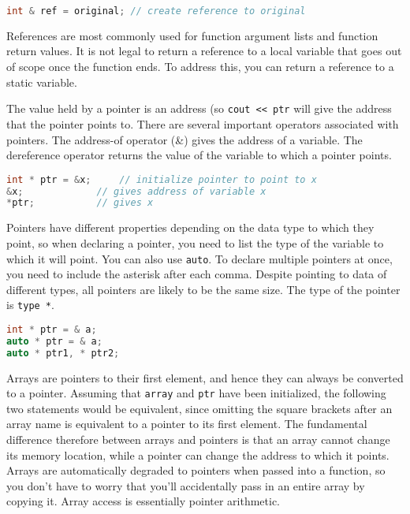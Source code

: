 \documentclass[10pt]{article}
\begin{document}
\begin{lstlisting}[language=C++]
int & ref = original; // create reference to original
\end{lstlisting}

References are most commonly used for function argument lists and function return values. It is not legal to return a reference to a local variable that goes out of scope once the function ends. To address this, you can return a reference to a static variable.

The value held by a pointer is an address (so \texttt{cout << ptr} will give the address that the pointer points to. There are several important operators associated with pointers. The address-of operator (\&) gives the address of a variable. The dereference operator returns the value of the variable to which a pointer points. 

\begin{lstlisting}[language=C++]
int * ptr = &x; 	// initialize pointer to point to x
&x; 			// gives address of variable x
*ptr; 			// gives x
\end{lstlisting}

Pointers have different properties depending on the data type to which they point, so when declaring a pointer, you need to list the type of the variable to which it will point. You can also use \texttt{auto}. To declare multiple pointers at once, you need to include the asterisk after each comma. Despite pointing to data of different types, all pointers are likely to be the same size. The type of the pointer is \texttt{type *}. 

\begin{lstlisting}[language=C++]
int * ptr = & a;
auto * ptr = & a;
auto * ptr1, * ptr2;
\end{lstlisting}

Arrays are pointers to their first element, and hence they can always be converted to a pointer. Assuming that \texttt{array} and \texttt{ptr} have been initialized, the following two statements would be equivalent, since omitting the square brackets after an array name is equivalent to a pointer to its first element. The fundamental difference therefore between arrays and pointers is that an array cannot change its memory location, while a pointer can change the address to which it points. Arrays are automatically degraded to pointers when passed into a function, so you don't have to worry that you'll accidentally pass in an entire array by copying it. Array access is essentially pointer arithmetic.
\end{document}
